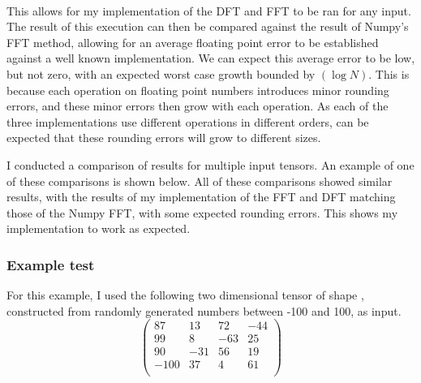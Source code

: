 \begin{code}
%
\\[\AgdaEmptyExtraSkip]%
\>[0]\AgdaSpace{}%
\AgdaSymbol{:}\AgdaSpace{}%
\AgdaSpace{}%
\AgdaSpace{}%
\AgdaSpace{}%
\AgdaSpace{}%
\AgdaSpace{}%
\AgdaSymbol{\{}\AgdaSymbol{\}}\AgdaSpace{}%
\<%
\\
\>[0]\AgdaSpace{}%
\AgdaSpace{}%
\AgdaSymbol{=}\AgdaSpace{}%
\<%
\\
\>[0][@{}l@{\AgdaIndent{0}}]%
\>[2]%
\>[24]\<%
\\
%
\>[2]%
\>[24]\<%
\\
%
\>[2]%
\>[24]\<%
\\
%
\>[2]%
\>[24]\<%
\end{code}

This allows for my implementation of the DFT and FFT to be ran for any input.
The result of this execution can then be compared against the result of Numpy's 
FFT method, allowing for an average floating point error to be established 
against a well known implementation.
We can expect this average error to be low, but not zero, with an expected worst 
case growth bounded by $\left(\log N\right)$\cite{FFT4Profit}.
This is because each operation on floating point numbers introduces minor
rounding errors, and these minor errors then grow with each operation.
As each of the three implementations use different operations in different
orders, can be expected that these rounding errors will grow to different sizes.

I conducted a comparison of results for multiple input tensors.
An example of one of these comparisons is shown below.
All of these comparisons showed similar results, with the results of my 
implementation of the FFT and DFT matching those of the Numpy FFT, 
with some expected rounding errors.
This shows my implementation to work as expected.

\subsubsection{Example test}
For this example, I used the following two dimensional tensor of shape 
, constructed from randomly generated numbers between 
-100 and 100, as input.
\[
\begin{pmatrix}
   87  &  13 &  72 & -44 \\
   99  &   8 & -63 &  25 \\
   90  & -31 &  56 &  19 \\
  -100 &  37 &  4  &  61 \\
\end{pmatrix}
\]

